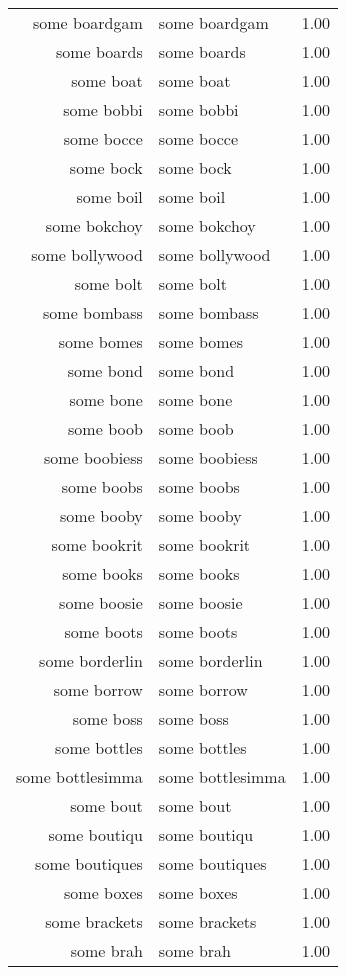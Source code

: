 \begin{table}[ht]
\begin{tabular}{rlr}
  some boardgam & some boardgam & 1.00 \\ 
  some boards & some boards & 1.00 \\ 
  some boat & some boat & 1.00 \\ 
  some bobbi & some bobbi & 1.00 \\ 
  some bocce & some bocce & 1.00 \\ 
  some bock & some bock & 1.00 \\ 
  some boil & some boil & 1.00 \\ 
  some bokchoy & some bokchoy & 1.00 \\ 
  some bollywood & some bollywood & 1.00 \\ 
  some bolt & some bolt & 1.00 \\ 
  some bombass & some bombass & 1.00 \\ 
  some bomes & some bomes & 1.00 \\ 
  some bond & some bond & 1.00 \\ 
  some bone & some bone & 1.00 \\ 
  some boob & some boob & 1.00 \\ 
  some boobiess & some boobiess & 1.00 \\ 
  some boobs & some boobs & 1.00 \\ 
  some booby & some booby & 1.00 \\ 
  some bookrit & some bookrit & 1.00 \\ 
  some books & some books & 1.00 \\ 
  some boosie & some boosie & 1.00 \\ 
  some boots & some boots & 1.00 \\ 
  some borderlin & some borderlin & 1.00 \\ 
  some borrow & some borrow & 1.00 \\ 
  some boss & some boss & 1.00 \\ 
  some bottles & some bottles & 1.00 \\ 
  some bottlesimma & some bottlesimma & 1.00 \\ 
  some bout & some bout & 1.00 \\ 
  some boutiqu & some boutiqu & 1.00 \\ 
  some boutiques & some boutiques & 1.00 \\ 
  some boxes & some boxes & 1.00 \\ 
  some brackets & some brackets & 1.00 \\ 
  some brah & some brah & 1.00 \\ 

\end{tabular}
\end{table}
